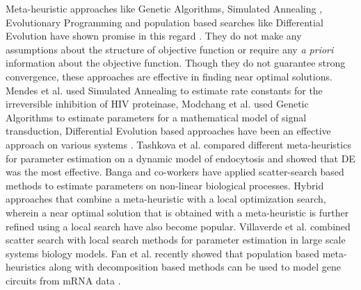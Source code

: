 \documentclass[12pt]{article}
\begin{document}
Meta-heuristic approaches like Genetic Algorithms, Simulated Annealing \cite{kirkpatrick1983optimization}, Evolutionary Programming and population based searches like Differential Evolution\cite{storn1997differential} have shown promise in this regard \cite{sun2012parameter}. They do not make any assumptions about the structure of objective function or require any \textit{a priori} information about the objective function. Though they do not guarantee strong convergence, these approaches are effective in finding near optimal solutions.  Mendes et al. \cite{mendes1998non} used Simulated Annealing to estimate rate constants for the irreversible inhibition of HIV proteinase, Modchang et al. \cite {modchang2008mathematical} used Genetic Algorithms to estimate parameters for a mathematical model of signal transduction, Differential Evolution based approaches have been an effective approach on various systems \cite{tsai2005evolutionary,wang2001hybrid,noman2007inferring}. Tashkova et al. \cite{tashkova2011parameter} compared different meta-heuristics for parameter estimation on a dynamic model of endocytosis and showed that DE was the most effective. Banga and co-workers have applied scatter-search based methods \cite{villaverde2012cooperative,rodriguez2006novel,egea2007scatter} to estimate parameters on non-linear biological processes. Hybrid approaches that combine a meta-heuristic with a local optimization search, wherein a near optimal solution that is obtained with a meta-heuristic is further refined using a local search have also become popular. Villaverde et al. \cite{villaverde2015biopredyn} combined scatter search with local search methods for parameter estimation in large scale systems biology models. Fan et al. recently showed that population based meta-heuristics along with decomposition based methods can be used to model gene circuits from mRNA data \cite{fan2015parameter}.
\end{document}
